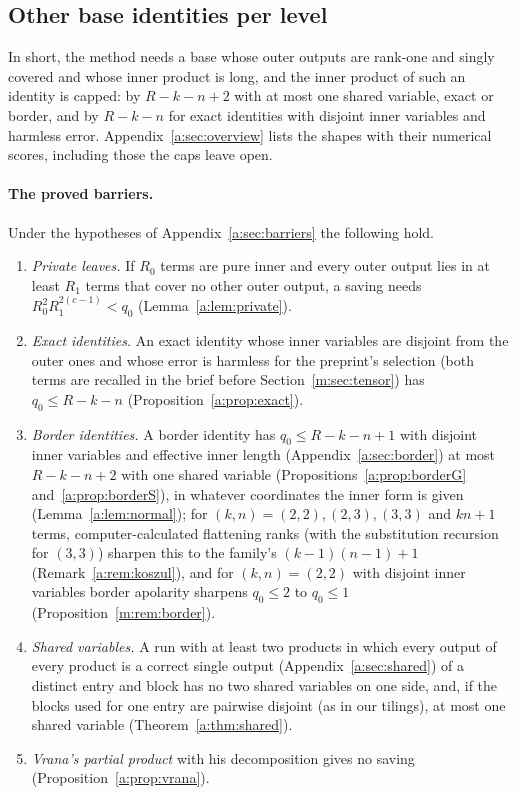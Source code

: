 \documentclass[11pt]{article}
\theoremstyle{definition}
\theoremstyle{remark}
\begin{document}
\subsection{Other base identities per level}\label{m:sec:barriers:identities}

In short, the method needs a base whose outer outputs are rank-one and singly covered and whose inner product is long, and the inner product of such an identity is capped: by $R-k-n+2$ with at most one shared variable, exact or border, and by $R-k-n$ for exact identities with disjoint inner variables and harmless error. Appendix~\ref{a:sec:overview} lists the shapes with their numerical scores, including those the caps leave open.

\paragraph{The proved barriers.} Under the hypotheses of Appendix~\ref{a:sec:barriers} the following hold.
\begin{enumerate}[label=(\arabic*),nosep]
\item \emph{Private leaves.} If $R_0$ terms are pure inner and every outer output lies in at least $R_1$ terms that cover no other outer output, a saving needs $R_0^2R_1^{2(c-1)}<q_0$ (Lemma~\ref{a:lem:private}).
\item \emph{Exact identities.} An exact identity whose inner variables are disjoint from the outer ones and whose error is harmless for the preprint's selection (both terms are recalled in the brief before Section~\ref{m:sec:tensor}) has $q_0\le R-k-n$ (Proposition~\ref{a:prop:exact}).
\item \emph{Border identities.} A border identity has $q_0\le R-k-n+1$ with disjoint inner variables and effective inner length (Appendix~\ref{a:sec:border}) at most $R-k-n+2$ with one shared variable (Propositions~\ref{a:prop:borderG} and~\ref{a:prop:borderS}), in whatever coordinates the inner form is given (Lemma~\ref{a:lem:normal}); for $(k,n)=(2,2),(2,3),(3,3)$ and $kn+1$ terms, computer-calculated flattening ranks (with the substitution recursion for $(3,3)$) sharpen this to the family's $(k-1)(n-1)+1$ (Remark~\ref{a:rem:koszul}), and for $(k,n)=(2,2)$ with disjoint inner variables border apolarity sharpens $q_0\le2$ to $q_0\le1$ (Proposition~\ref{m:rem:border}).
\item \emph{Shared variables.} A run with at least two products in which every output of every product is a correct single output (Appendix~\ref{a:sec:shared}) of a distinct entry and block has no two shared variables on one side, and, if the blocks used for one entry are pairwise disjoint (as in our tilings), at most one shared variable (Theorem~\ref{a:thm:shared}).
\item \emph{Vrana's partial product} with his decomposition gives no saving (Proposition~\ref{a:prop:vrana}).
\end{enumerate}
\end{document}

